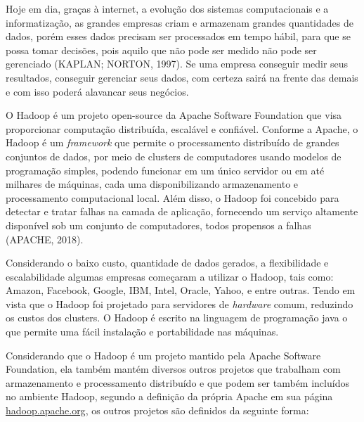 Hoje em dia, graças à internet, a evolução dos sistemas computacionais e a informatização, as grandes empresas criam e armazenam grandes quantidades de dados, porém esses dados precisam ser processados em tempo hábil, para que se possa tomar decisões, pois aquilo que não pode ser medido não pode ser gerenciado (KAPLAN; NORTON, 1997). Se uma empresa conseguir medir seus resultados, conseguir gerenciar seus dados, com certeza sairá na frente das demais e com isso poderá alavancar seus negócios.

O Hadoop é um projeto open-source da Apache Software Foundation que visa proporcionar  computação distribuída, escalável e confiável. Conforme a Apache, o Hadoop é um \textit{framework} que permite o processamento distribuído de grandes conjuntos de dados, por meio de clusters de computadores usando modelos de programação simples, podendo funcionar em um único servidor ou em até milhares de máquinas, cada uma disponibilizando armazenamento e processamento computacional local. Além disso, o Hadoop foi concebido para detectar e tratar falhas na camada de aplicação, fornecendo um serviço altamente disponível sob um conjunto de computadores, todos propensos a falhas (APACHE, 2018).

Considerando o baixo custo, quantidade de dados gerados, a flexibilidade e escalabilidade algumas empresas começaram a utilizar o Hadoop, tais como: Amazon, Facebook, Google, IBM, Intel, Oracle, Yahoo, e entre outras. Tendo em vista que o Hadoop foi projetado para servidores de \textit{hardware} comum, reduzindo os custos dos clusters. O Hadoop é escrito na linguagem de programação java o que permite uma fácil instalação e portabilidade nas máquinas.

Considerando que o Hadoop é um projeto mantido pela Apache Software Foundation, ela também mantém diversos outros projetos que trabalham com armazenamento e processamento distribuído e que podem ser também incluídos no ambiente Hadoop, segundo a definição da própria Apache em sua página \url{hadoop.apache.org}, os outros projetos são definidos da seguinte forma:

